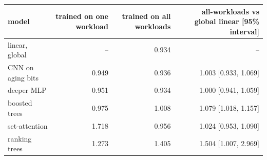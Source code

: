 \begin{tabular}{lrrr}
\toprule
model & trained on one workload & trained on all workloads & all-workloads vs global linear [95\% interval] \\
\midrule
linear, global & -- & 0.934 & -- \\
CNN on aging bits & 0.949 & 0.936 & 1.003 [0.933, 1.069] \\
deeper MLP & 0.951 & 0.934 & 1.000 [0.941, 1.059] \\
boosted trees & 0.975 & 1.008 & 1.079 [1.018, 1.157] \\
set-attention & 1.718 & 0.956 & 1.024 [0.953, 1.090] \\
ranking trees & 1.273 & 1.405 & 1.504 [1.007, 2.969] \\
\bottomrule
\end{tabular}
